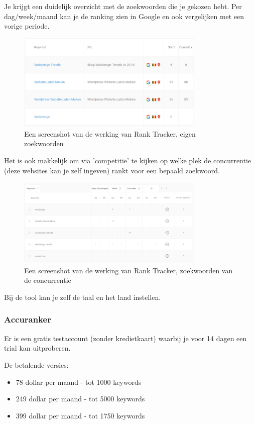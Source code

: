 Je krijgt een duidelijk overzicht met de zoekwoorden die je gekozen hebt. Per dag/week/maand kan je de ranking zien in Google en ook vergelijken met een vorige periode. 

\begin{figure}[h!]
\centering
\includegraphics[width=0.8\textwidth]{img/ranktracker.PNG}
\caption{Een screenshot van de werking van Rank Tracker, eigen zoekwoorden
\autocite{ranktracker}}
\end{figure}

Het is ook makkelijk om via 'competitie' te kijken op welke plek de concurrentie (deze websites kan je zelf ingeven) rankt voor een bepaald zoekwoord.

\begin{figure}[h!]
\centering
\includegraphics[width=0.8\textwidth]{img/ranktrackercom.PNG}
\caption{Een screenshot van de werking van Rank Tracker, zoekwoorden van de concurrentie
\autocite{ranktracker}}
\end{figure}

Bij de tool kan je zelf de taal en het land instellen. 

\subsubsection{Accuranker}
\label{ch: Accuranker}
Er is een gratis testaccount (zonder kredietkaart) waarbij je voor 14 dagen een trial kan uitproberen. 

De betalende versies: 
\begin{itemize}
\item 78 dollar per maand - tot 1000 keywords
\item 249 dollar per maand - tot 5000 keywords
\item 399 dollar per maand - tot 1750 keywords
\end{itemize}

